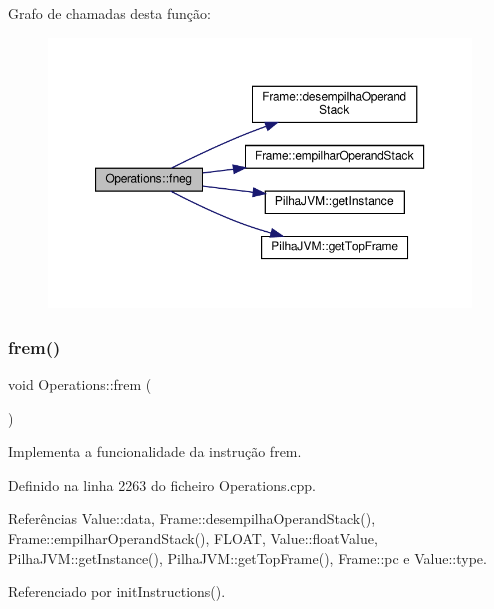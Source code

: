 Grafo de chamadas desta função\+:\nopagebreak
\begin{figure}[H]
\begin{center}
\leavevmode
\includegraphics[width=350pt]{classOperations_a17a7d8f333373d30ae5b1595d96594e5_cgraph}
\end{center}
\end{figure}
\mbox{\label{classOperations_ad29eac4f222e4b74667086c3da0d5538}} 
\subsubsection{\texorpdfstring{frem()}{frem()}}
{\footnotesize\ttfamily void Operations\+::frem (\begin{DoxyParamCaption}{ }\end{DoxyParamCaption})\hspace{0.3cm}{\ttfamily [private]}}



Implementa a funcionalidade da instrução frem. 



Definido na linha 2263 do ficheiro Operations.\+cpp.



Referências Value\+::data, Frame\+::desempilha\+Operand\+Stack(), Frame\+::empilhar\+Operand\+Stack(), F\+L\+O\+AT, Value\+::float\+Value, Pilha\+J\+V\+M\+::get\+Instance(), Pilha\+J\+V\+M\+::get\+Top\+Frame(), Frame\+::pc e Value\+::type.



Referenciado por init\+Instructions().

